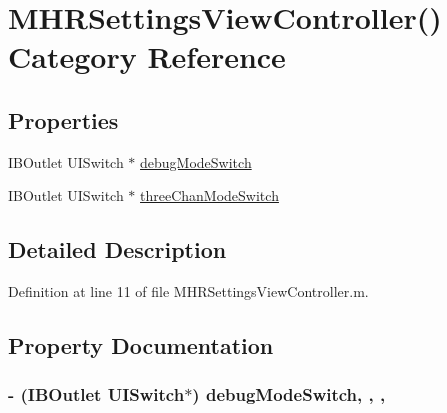 \hypertarget{category_m_h_r_settings_view_controller_07_08}{\section{M\+H\+R\+Settings\+View\+Controller() Category Reference}
\label{category_m_h_r_settings_view_controller_07_08}
}
\subsection*{Properties}
\begin{DoxyCompactItemize}
\item 
I\+B\+Outlet U\+I\+Switch $\ast$ \hyperlink{category_m_h_r_settings_view_controller_07_08_a1aa168471752fac727fa69e4be17b438}{debug\+Mode\+Switch}
\item 
I\+B\+Outlet U\+I\+Switch $\ast$ \hyperlink{category_m_h_r_settings_view_controller_07_08_a1895b1abc4ef23d82293f905fbd27468}{three\+Chan\+Mode\+Switch}
\end{DoxyCompactItemize}


\subsection{Detailed Description}


Definition at line 11 of file M\+H\+R\+Settings\+View\+Controller.\+m.



\subsection{Property Documentation}
\hypertarget{category_m_h_r_settings_view_controller_07_08_a1aa168471752fac727fa69e4be17b438}{
\subsubsection[{debug\+Mode\+Switch}]{\setlength{\rightskip}{0pt plus 5cm}-\/ (I\+B\+Outlet U\+I\+Switch$\ast$) debug\+Mode\+Switch\hspace{0.3cm}{\ttfamily [read]}, {\ttfamily [write]}, {\ttfamily [nonatomic]}, {\ttfamily [weak]}}}\label{category_m_h_r_settings_view_controller_07_08_a1aa168471752fac727fa69e4be17b438}


